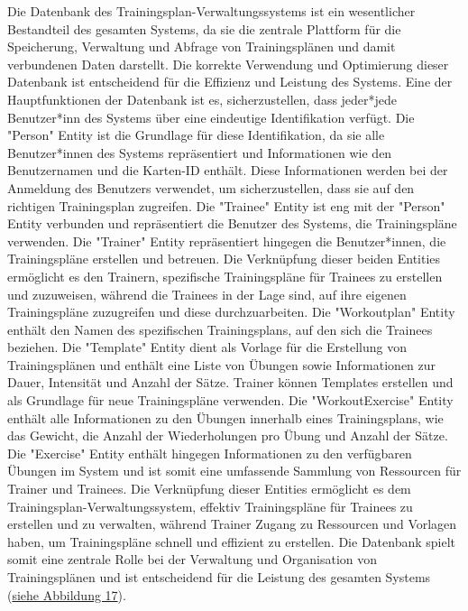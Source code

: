 Die Datenbank des Trainingsplan-Verwaltungssystems ist ein wesentlicher Bestandteil des gesamten Systems, da sie die zentrale Plattform für die Speicherung, Verwaltung und Abfrage von Trainingsplänen und damit verbundenen Daten darstellt. Die korrekte Verwendung und Optimierung dieser Datenbank ist entscheidend für die Effizienz und Leistung des Systems.
\newline
\newline
Eine der Hauptfunktionen der Datenbank ist es, sicherzustellen, dass jeder*jede Benutzer*inn des Systems über eine eindeutige Identifikation verfügt. Die "Person" Entity ist die Grundlage für diese Identifikation, da sie alle Benutzer*innen des Systems repräsentiert und Informationen wie den Benutzernamen und die Karten-ID enthält. Diese Informationen werden bei der Anmeldung des Benutzers verwendet, um sicherzustellen, dass sie auf den richtigen Trainingsplan zugreifen.
\newline
\newline
Die "Trainee" Entity ist eng mit der "Person" Entity verbunden und repräsentiert die Benutzer des Systems, die Trainingspläne verwenden. Die "Trainer" Entity repräsentiert hingegen die Benutzer*innen, die Trainingspläne erstellen und betreuen. Die Verknüpfung dieser beiden Entities ermöglicht es den Trainern, spezifische Trainingspläne für Trainees zu erstellen und zuzuweisen, während die Trainees in der Lage sind, auf ihre eigenen Trainingspläne zuzugreifen und diese durchzuarbeiten.
\newline
\newline
Die "Workoutplan" Entity enthält den Namen des spezifischen Trainingsplans, auf den sich die Trainees beziehen. Die "Template" Entity dient als Vorlage für die Erstellung von Trainingsplänen und enthält eine Liste von Übungen sowie Informationen zur Dauer, Intensität und Anzahl der Sätze. Trainer können Templates erstellen und als Grundlage für neue Trainingspläne verwenden.
\newline
\newline
Die "WorkoutExercise" Entity enthält alle Informationen zu den Übungen innerhalb eines Trainingsplans, wie das Gewicht, die Anzahl der Wiederholungen pro Übung und Anzahl der Sätze. Die "Exercise" Entity enthält hingegen Informationen zu den verfügbaren Übungen im System und ist somit eine umfassende Sammlung von Ressourcen für Trainer und Trainees.
\newpage
Die Verknüpfung dieser Entities ermöglicht es dem Trainingsplan-Verwaltungssystem, effektiv Trainingspläne für Trainees zu erstellen und zu verwalten, während Trainer Zugang zu Ressourcen und Vorlagen haben, um Trainingspläne schnell und effizient zu erstellen. Die Datenbank spielt somit eine zentrale Rolle bei der Verwaltung und Organisation von Trainingsplänen und ist entscheidend für die Leistung des gesamten Systems (\hyperref[fig:erd]{siehe Abbildung 17}).
